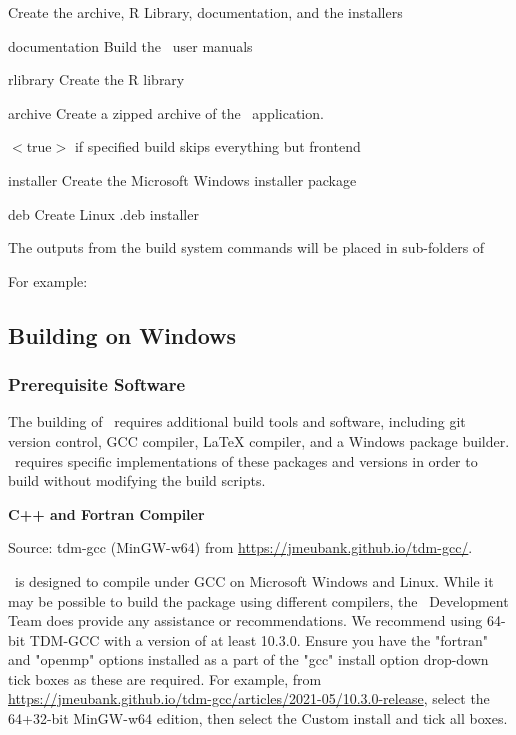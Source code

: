 Create the archive, R Library, documentation, and the installers
\begin{description}
  \item{documentation} Build the \CNAME\ user manuals
  \item{rlibrary} Create the R library
  \item{archive} Create a zipped archive of the \CNAME\ application.
  \begin{description}
     \item{$<$true$>$} if specified build skips everything but frontend
  \end{description}
  \item{installer} Create the Microsoft Windows installer package
  \item{deb} Create Linux .deb installer
\end{description}

The outputs from the build system commands will be placed in sub-folders of 

For example:





\subsection{Building on Windows}

\subsubsection{Prerequisite Software}

The building of \CNAME\ requires additional build tools and software, including git version control, GCC compiler, LaTeX compiler, and a Windows package builder. \CNAME\ requires specific implementations of these packages and versions in order to build without modifying the build scripts.

\textbf{C++ and Fortran Compiler}

Source: tdm-gcc (MinGW-w64) from \url{https://jmeubank.github.io/tdm-gcc/}.

\CNAME\ is designed to compile under GCC on Microsoft Windows and Linux. While it may be possible to build the package using different compilers, the \CNAME\ Development Team does provide any assistance or recommendations. We recommend using 64-bit TDM-GCC with a version of at least 10.3.0. Ensure you have the "fortran" and "openmp" options installed as a part of the "gcc" install option drop-down tick boxes as these are required. For example, from  \url{https://jmeubank.github.io/tdm-gcc/articles/2021-05/10.3.0-release}, select the 64+32-bit MinGW-w64 edition, then select the Custom install and tick all boxes. 

